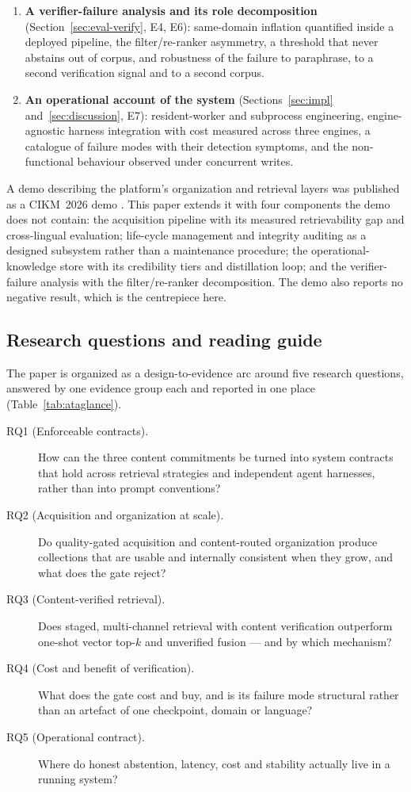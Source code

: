 \begin{enumerate}
\item \textbf{A verifier-failure analysis and its role decomposition}
(Section~\ref{sec:eval-verify}, E4, E6): same-domain inflation quantified
inside a deployed pipeline, the filter/re-ranker asymmetry, a threshold that
never abstains out of corpus, and robustness of the failure to paraphrase, to
a second verification signal and to a second corpus.
\item \textbf{An operational account of the system} (Sections~\ref{sec:impl}
and~\ref{sec:discussion}, E7): resident-worker and subprocess engineering,
engine-agnostic harness integration with cost measured across three engines,
a catalogue of failure modes with their detection symptoms, and the
non-functional behaviour observed under concurrent writes.
\end{enumerate}

A demo describing the platform's organization and retrieval layers was
published as a CIKM~2026 demo \cite{qdcvr-demo}. This paper extends it with
four components the demo does not contain: the acquisition pipeline with its
measured retrievability gap and cross-lingual evaluation; life-cycle
management and integrity auditing as a designed subsystem rather than a
maintenance procedure; the operational-knowledge store with its credibility
tiers and distillation loop; and the verifier-failure analysis with the
filter/re-ranker decomposition. The demo also reports no negative result, which
is the centrepiece here.

\subsection{Research questions and reading guide}
\label{sec:rq}

The paper is organized as a design-to-evidence arc around five research
questions, answered by one evidence group each and reported in one place
(Table~\ref{tab:ataglance}).

\begin{description}
\item[RQ1 (Enforceable contracts).] How can the three content commitments be
turned into system contracts that hold across retrieval strategies and
independent agent harnesses, rather than into prompt conventions?
\item[RQ2 (Acquisition and organization at scale).] Do quality-gated
acquisition and content-routed organization produce collections that are
usable and internally consistent when they grow, and what does the gate
reject?
\item[RQ3 (Content-verified retrieval).] Does staged, multi-channel retrieval
with content verification outperform one-shot vector top-$k$ and unverified
fusion --- and by which mechanism?
\item[RQ4 (Cost and benefit of verification).] What does the gate cost and
buy, and is its failure mode structural rather than an artefact of one
checkpoint, domain or language?
\item[RQ5 (Operational contract).] Where do honest abstention, latency, cost
and stability actually live in a running system?
\end{description}

